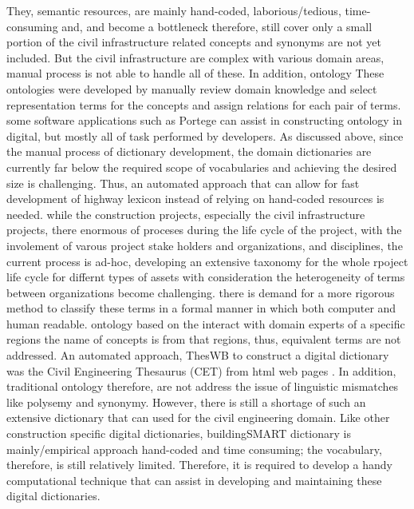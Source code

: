 \documentclass[Journal, BackFigs, DoubleSpace]{ascelike} %
\begin{document}
They, semantic resources, are mainly hand-coded, laborious/tedious, time-consuming and, and become a bottleneck therefore, still cover only a small portion of the civil infrastructure related concepts and synonyms are not yet included. But the civil infrastructure are complex with various domain areas, manual process is not able to handle all of these. In addition, ontology These ontologies were developed by manually review domain knowledge and select representation terms for the concepts and assign relations for each pair of terms. some software applications such as Portege can assist in constructing ontology in digital, but mostly all of task performed by developers. As discussed above, since the manual process of dictionary development, the domain dictionaries are currently far below the required scope of vocabularies and achieving the desired size is challenging. Thus, an automated approach that can allow for fast development of highway lexicon instead of relying on hand-coded resources is needed. while the construction projects, especially the civil infrastructure projects, there enormous of proceses during the life cycle of the project, with the involement of varous project stake holders and organizations, and disciplines, the current process is ad-hoc, developing an extensive taxonomy for the whole rpoject life cycle for differnt types of assets with consideration the heterogeneity of terms between organizations become challenging. there is demand for a more rigorous method to classify these terms in a formal manner in which both computer and human readable. ontology based on the interact with domain experts of a specific regions the name of concepts is from that regions, thus, equivalent terms are not addressed. 
%
An automated approach, ThesWB to construct a digital dictionary was the Civil Engineering Thesaurus (CET) from html web pages \cite{abuzir02}. In addition, traditional ontology therefore, are not address the issue of linguistic mismatches like polysemy and synonymy. However, there is still a shortage of such an extensive dictionary that can used for the civil engineering domain. Like other construction specific digital dictionaries, buildingSMART dictionary is mainly/empirical approach hand-coded and time consuming; the vocabulary, therefore, is still relatively limited. Therefore, it is required to develop a handy computational technique that can assist in developing and maintaining these digital dictionaries.
\end{document}
